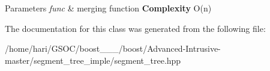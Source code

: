 \begin{DoxyParams}{Parameters}
{\em func} & merging function {\bfseries  Complexity } O(n) \\
\hline
\end{DoxyParams}


The documentation for this class was generated from the following file\+:\begin{DoxyCompactItemize}
\item 
/home/hari/\+G\+S\+O\+C/boost\+\_\+\_\+\_/boost/\+Advanced-\/\+Intrusive-\/master/segment\+\_\+tree\+\_\+imple/segment\+\_\+tree.\+hpp\end{DoxyCompactItemize}

